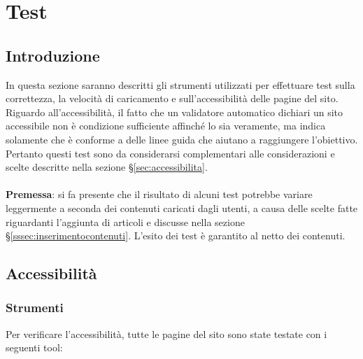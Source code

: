 \documentclass[12pt]{article}
\begin{document}
	\newpage
	\appendix
	
	\section{Test}
	\subsection{Introduzione}
	In questa sezione saranno descritti gli strumenti utilizzati per effettuare test sulla correttezza, la velocità di caricamento e sull'accessibilità delle pagine del sito. \\Riguardo all'accessibilità, il fatto che un validatore automatico dichiari un sito accessibile non è condizione sufficiente affinché lo sia veramente, ma indica solamente che è conforme a delle linee guida che aiutano a raggiungere l'obiettivo. Pertanto questi test sono da considerarsi complementari alle considerazioni e scelte descritte nella sezione §\ref{sec:accessibilita}. \\ \\
	\textbf{Premessa}: si fa presente che il risultato di alcuni test potrebbe variare leggermente a seconda dei contenuti caricati dagli utenti, a causa delle scelte fatte riguardanti l'aggiunta di articoli e discusse nella sezione §\ref{sssec:inserimentocontenuti}. L'esito dei test è garantito al netto dei contenuti.
	
	\subsection{Accessibilità} \label{ssec:testaccessibilita}
	
	\subsubsection{Strumenti}

	\noindent Per verificare l'accessibilità, tutte le pagine del sito sono state testate con i seguenti tool:
	
\end{document}

